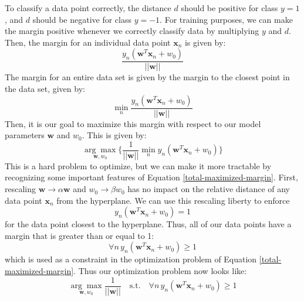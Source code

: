 To classify a data point correctly, the distance $d$ should be positive for class $y = 1$, and $d$ should be negative for class $y = -1$. For training purposes, we can make the margin positive whenever we correctly classify data by multiplying $y$ and $d$. Then, the margin for an individual data point $\textbf{x}_{n}$ is given by:
\begin{equation} \label{individual-margin}
	\frac{y_{n}(\textbf{w}^{T}\textbf{x}_{n} + w_{0})}{||\textbf{w}||}
\end{equation}
The margin for an entire data set is given by the margin to the closest point in the data set, given by:
\begin{equation} \label{total-margin}
	\min_{n} \frac{y_{n}(\textbf{w}^{T}\textbf{x}_{n} + w_{0})}{||\textbf{w}||}
\end{equation}
Then, it is our goal to maximize this margin with respect to our model parameters $\textbf{w}$ and $w_{0}$. This is given by:
\begin{equation} \label{total-maximized-margin}
	\underset{\textbf{w}, w_{0}}{\arg\max} \big\{ \frac{1}{||\textbf{w}||} \min_{n} y_{n}(\textbf{w}^{T}\textbf{x}_{n} + w_{0}) \big\}
\end{equation}
This is a hard problem to optimize, but we can make it more tractable by recognizing some important features of Equation \ref{total-maximized-margin}. First, rescaling $\textbf{w} \rightarrow \alpha \textbf{w}$ and $w_{0} \rightarrow \beta w_{0}$ has no impact on the relative distance of any data point $\textbf{x}_{n}$ from the hyperplane. We can use this rescaling liberty to enforce
\begin{equation} \label{enfore-dist-to-1}
	y_{n}(\textbf{w}^{T}\textbf{x}_{n} + w_{0}) = 1
\end{equation}
for the data point closest to the hyperplane. Thus, all of our data points have a margin that is greater than or equal to 1:
\begin{equation} \label{new-margin-constraint}
	\forall n \, y_{n}(\textbf{w}^{T}\textbf{x}_{n} + w_{0}) \geq 1
\end{equation}
which is used as a constraint in the optimization problem of Equation \ref{total-maximized-margin}. Thus our optimization problem now looks like:
\begin{equation} \label{simplified-maximized-margin-optimization}
	\underset{\textbf{w}, w_{0}}{\arg\max} \frac{1}{||\textbf{w}||} \quad \text{s.t.} \quad \forall n \, y_{n}(\textbf{w}^{T}\textbf{x}_{n} + w_{0}) \geq 1
\end{equation}
